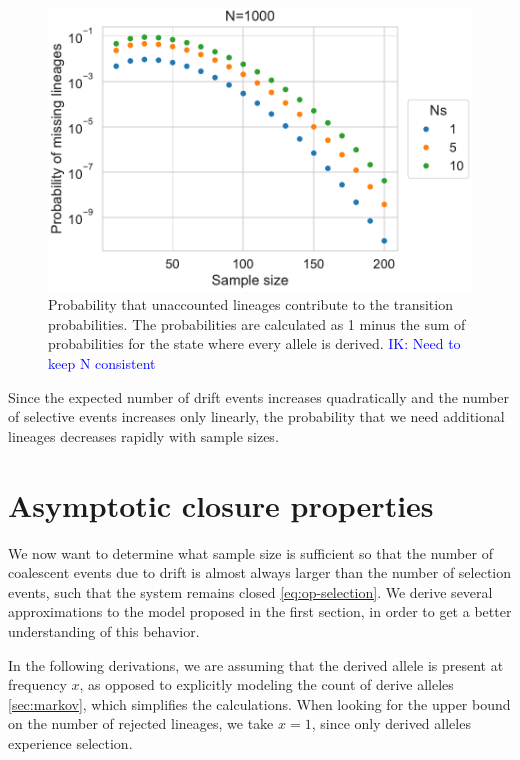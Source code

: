 \documentclass[review]{elsarticle}
\newcommand{\ikcomment}[1]{\textcolor{blue}{IK: #1}}
\begin{document}
\begin{figure}
  \centering
  \includegraphics[]{fig/missing.pdf}
  \caption{Probability that unaccounted lineages contribute to the transition probabilities. The
    probabilities are calculated as 1 minus the sum of probabilities for the state where every
    allele is derived. \ikcomment{Need to keep N consistent}}
  \label{fig:missing}
\end{figure}

Since the expected number of drift events increases quadratically and the number of selective events
increases only linearly, the probability that we need additional lineages decreases rapidly with
sample sizes.

\section{Asymptotic closure properties}

We now want to determine what sample size is sufficient so that the number of coalescent events due
to drift is almost always larger than the number of selection events, such that the system remains
closed \eqref{eq:op-selection}. We derive several approximations to the model proposed in the first
section, in order to get a better understanding of this behavior.

In the following derivations, we are assuming that the derived allele is present at frequency $x$,
as opposed to explicitly modeling the count of derive alleles \ref{sec:markov}, which simplifies the
calculations. When looking for the upper bound on the number of rejected lineages, we take $x=1$,
since only derived alleles experience selection.
\end{document}
